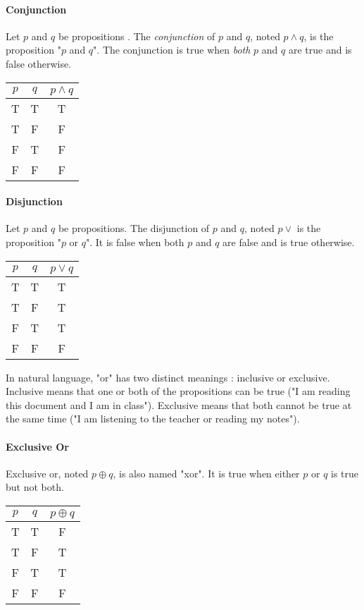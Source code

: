 \documentclass[10pt,a4paper]{book}
\begin{document}
\paragraph*{Conjunction}
Let $p$ and $q$ be propositions . The \textit{conjunction} of $p$ and $q$, noted $p \land q$, is the proposition "$p$ and $q$". The conjunction is true when \textit{both} $p$ and $q$ are true and is false otherwise. \\
\begin{tabular}{ |c  c | c| }
\hline
 $p$ & $q$ & $p\land q$\\
 \hline
 T & T & T \\ 
 T & F & F \\  
 F & T & F \\
 F & F & F \\
 \hline
\end{tabular}
\paragraph*{Disjunction}
Let $p$ and $q$ be propositions. The disjunction of $p$ and $q$, noted $p\lor $ is the proposition "$p$ or $q$". It is false when both $p$ and $q$ are false and is true otherwise.\\
\begin{tabular}{ |c  c | c| }
\hline
 $p$ & $q$ & $p\lor q$\\
 \hline
 T & T & T \\ 
 T & F & T \\  
 F & T & T \\
 F & F & F \\
 \hline
\end{tabular}\par
In natural language, "or" has two distinct meanings : inclusive or exclusive. Inclusive means that one or both of the propositions can be true ("I am reading this document and I am in class"). Exclusive means that both cannot be true at the same time ("I am listening to the teacher or reading my notes").
\paragraph*{Exclusive Or}
Exclusive or, noted $p \oplus q$, is also named "xor". It is true when either $p$ or $q$ is true but not both.\\
\begin{tabular}{ |c  c | c| }
\hline
 $p$ & $q$ & $p\oplus q$\\
 \hline
 T & T & F \\ 
 T & F & T \\  
 F & T & T \\
 F & F & F \\
 \hline
\end{tabular}
\end{document}
